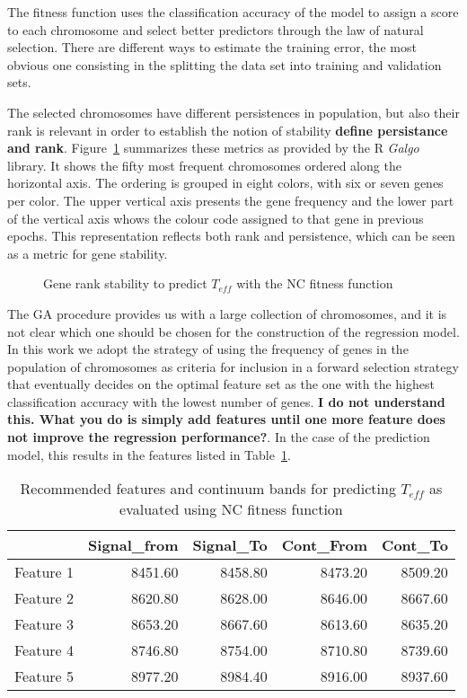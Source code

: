 The fitness function uses the classification accuracy of the model to
assign a score to each chromosome and select better predictors through
the law of natural selection. There are different ways to estimate the
training error, the most obvious one consisting in the splitting the
data set into training and validation sets.


The selected chromosomes have different persistences in population,
but also their rank is relevant in order to establish the notion of
stability {\bf define persistance and rank}. Figure~\ref{fig:chr-stab}
summarizes these metrics as provided by the R {\sl Galgo} library. It
shows the fifty most frequent chromosomes ordered along the horizontal
axis. The ordering is grouped in eight colors, with six or seven genes
per color. The upper vertical axis presents the gene frequency and the
lower part of the vertical axis whows the colour code assigned to that
gene in previous epochs.  This representation reflects both rank and
persistence, which can be seen as a metric for gene stability. 

\begin{figure}
\begin {center}
\caption{Gene rank stability to predict $T_{eff}$ with the NC fitness
  function}
\label{fig:chr-stab}
 \end{center}
\end{figure}

The GA procedure provides us with a large collection of chromosomes,
and it is not clear which one should be chosen for the construction of
the regression model. In this work we adopt the strategy of using the
frequency of genes in the population of chromosomes as criteria for
inclusion in a forward selection strategy that eventually decides on
the optimal feature set as the one with the highest classification
accuracy with the lowest number of genes. {\bf I do not understand
  this. What you do is simply add features until one more feature does
  not improve the regression performance?}. In the case of the \teff
prediction model, this results in the features listed in
Table~\ref{tab:tab_NC_T}.

\begin{table}
\begin{center}
\begin{tabular}{rrrrr}
  \hline
 & Signal\_from & Signal\_To & Cont\_From & Cont\_To \\ 
  \hline
Feature 1 & 8451.60 & 8458.80 & 8473.20 & 8509.20 \\ 
Feature 2 & 8620.80 & 8628.00 & 8646.00 & 8667.60 \\ 
Feature 3 & 8653.20 & 8667.60 & 8613.60 & 8635.20 \\ 
Feature 4 & 8746.80 & 8754.00 & 8710.80 & 8739.60 \\ 
Feature 5 & 8977.20 & 8984.40 & 8916.00 & 8937.60 \\ 
   \hline
\end{tabular}
\caption {Recommended features and continuum bands for predicting
  $T_{eff}$ as evaluated using NC fitness
  function} \label{tab:tab_NC_T}
\end{center}
\end{table}


